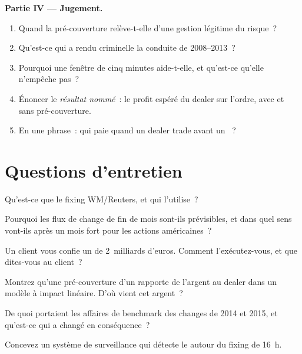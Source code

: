 \begin{problem}
\medskip\noindent\textbf{Partie IV --- Jugement.}
\begin{enumerate}[resume]
\item Quand la pré-couverture relève-t-elle d'une gestion légitime du risque~?
\item Qu'est-ce qui a rendu criminelle la conduite de 2008--2013~?
\item Pourquoi une fenêtre de cinq minutes aide-t-elle, et qu'est-ce qu'elle n'empêche pas~?
\item Énoncer le \emph{résultat nommé}~: le profit espéré du dealer sur l'ordre, avec
et sans pré-couverture.
\item En une phrase~: qui paie quand un dealer trade avant un ~?
\end{enumerate}
\end{problem}

\section{Questions d'entretien}

\begin{interviewq}\label{iq:m2:fixings-and-flows:1}
Qu'est-ce que le fixing WM/Reuters, et qui l'utilise~?
\end{interviewq}

\begin{interviewq}\label{iq:m2:fixings-and-flows:2}
Pourquoi les flux de change de fin de mois sont-ils prévisibles, et dans quel sens vont-ils après
un mois fort pour les actions américaines~?
\end{interviewq}

\begin{interviewq}\label{iq:m2:fixings-and-flows:3}
Un client vous confie un  de 2~milliards d'euros. Comment l'exécutez-vous, et que
dites-vous au client~?
\end{interviewq}

\begin{interviewq}\label{iq:m2:fixings-and-flows:4}
Montrez qu'une pré-couverture d'un  rapporte de l'argent au dealer dans un modèle à
impact linéaire. D'où vient cet argent~?
\end{interviewq}

\begin{interviewq}\label{iq:m2:fixings-and-flows:5}
De quoi portaient les affaires de benchmark des changes de 2014 et 2015, et qu'est-ce qui a changé
en conséquence~?
\end{interviewq}

\begin{interviewq}\label{iq:m2:fixings-and-flows:6}
Concevez un système de surveillance qui détecte le  autour du fixing de 16~h.
\end{interviewq}
